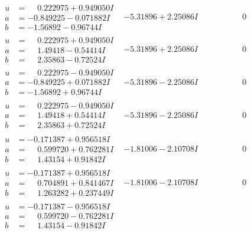 \documentclass[1p]{elsarticle_modified}
\theoremstyle{definition}
\begin{document}
$$\begin{array}{c|c|c}
\begin{aligned}
u &= \phantom{-}0.222975 + 0.949050 I \\
a &= -0.849225 - 0.071882 I \\
b &= -1.56892 - 0.96744 I\end{aligned}
 & -5.31896 + 2.25086 I & \phantom{-0.000000 } 0 \\ \hline\begin{aligned}
u &= \phantom{-}0.222975 + 0.949050 I \\
a &= \phantom{-}1.49418 - 0.54414 I \\
b &= \phantom{-}2.35863 - 0.72524 I\end{aligned}
 & -5.31896 + 2.25086 I & \phantom{-0.000000 } 0 \\ \hline\begin{aligned}
u &= \phantom{-}0.222975 - 0.949050 I \\
a &= -0.849225 + 0.071882 I \\
b &= -1.56892 + 0.96744 I\end{aligned}
 & -5.31896 - 2.25086 I & \phantom{-0.000000 } 0 \\ \hline\begin{aligned}
u &= \phantom{-}0.222975 - 0.949050 I \\
a &= \phantom{-}1.49418 + 0.54414 I \\
b &= \phantom{-}2.35863 + 0.72524 I\end{aligned}
 & -5.31896 - 2.25086 I & \phantom{-0.000000 } 0 \\ \hline\begin{aligned}
u &= -0.171387 + 0.956518 I \\
a &= \phantom{-}0.599720 + 0.762281 I \\
b &= \phantom{-}1.43154 + 0.91842 I\end{aligned}
 & -1.81006 - 2.10708 I & \phantom{-0.000000 } 0 \\ \hline\begin{aligned}
u &= -0.171387 + 0.956518 I \\
a &= \phantom{-}0.704891 + 0.841467 I \\
b &= \phantom{-}1.263282 + 0.237449 I\end{aligned}
 & -1.81006 - 2.10708 I & \phantom{-0.000000 } 0 \\ \hline\begin{aligned}
u &= -0.171387 - 0.956518 I \\
a &= \phantom{-}0.599720 - 0.762281 I \\
b &= \phantom{-}1.43154 - 0.91842 I\end{aligned}

\end{array}$$
\end{document}
